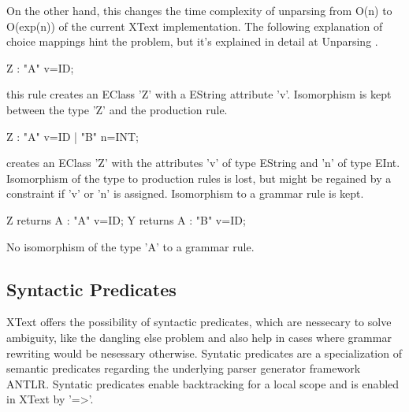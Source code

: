 On the other hand, this changes the time complexity of unparsing from O(n) to O(exp(n)) of the current XText implementation. The following explanation of choice mappings hint the problem, but it's explained in detail at Unparsing .
\begin{xtxt}
Z 	:  "A" v=ID;
\end{xtxt}
this rule creates an EClass 'Z' with a EString attribute 'v'. Isomorphism is kept between the type 'Z' and the production rule.
\begin{xtxt}
Z 	:  "A" v=ID  
	|  "B" n=INT;
	\end{xtxt}
creates an EClass 'Z' with the attributes 'v' of type EString and 'n' of type EInt.  Isomorphism of the type to production rules is lost, but might be regained by a constraint if 'v' or 'n' is assigned. Isomorphism to a grammar rule is kept.
\begin{xtxt}
Z returns A : "A" v=ID;
Y returns A : "B" v=ID;
\end{xtxt}
No isomorphism of the type 'A' to a grammar rule.

\subsection{Syntactic Predicates}
XText offers the possibility of syntactic predicates, which are nessecary to solve ambiguity, like the dangling else problem and also help in cases where grammar rewriting would be nesessary otherwise. Syntatic predicates are a specialization of semantic predicates regarding the underlying parser generator framework ANTLR. Syntatic predicates enable backtracking for a local scope and is enabled in XText by '=>'.